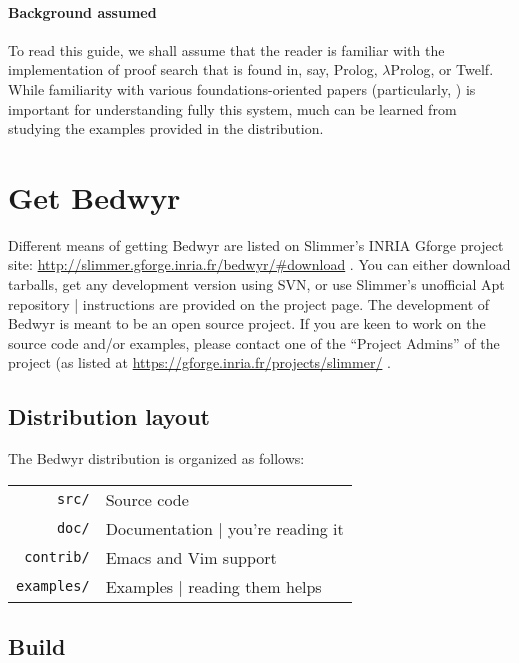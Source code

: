 \documentclass{article}
\newcommand{\lp}{$\lambda$Prolog}
\begin{document}
\paragraph{Background assumed}
To read this guide, we shall assume that the reader is familiar with
the implementation of proof search that is found in, say, Prolog,
\lp{}, or Twelf.  While familiarity with various foundations-oriented
papers (particularly,
\cite{mcdowell03tcs,miller05tocl,tiu04phd,baelde08lfmtp,tiu10tocl}) is
important for understanding fully this system, much can be learned
from studying the examples provided in the distribution.


\section{Get Bedwyr}

Different means of getting Bedwyr are listed on Slimmer's INRIA Gforge
project site:
\urldef{\thisurl}\url{http://slimmer.gforge.inria.fr/bedwyr/#download}
\ahrefurl{\thisurl}.
You can either download tarballs, get any development version using SVN,
or use Slimmer's unofficial Apt repository | instructions are provided
on the project page.
The development of Bedwyr is meant to be an open source project.
If you are keen to work on the source code and/or examples, please contact
one of the ``Project Admins'' of the project (as listed at
\urldef{\thisurl}\url{https://gforge.inria.fr/projects/slimmer/}
\ahrefurl{\thisurl}.

\subsection{Distribution layout}

The Bedwyr distribution is organized as follows:

\begin{tabular}{r@{\quad}l}
  \texttt{src/}      & Source code \\
  \texttt{doc/}      & Documentation | you're reading it \\
  \texttt{contrib/}  & Emacs and Vim support \\
  \texttt{examples/} & Examples | reading them helps
\end{tabular}

\subsection{Build}
\end{document}
